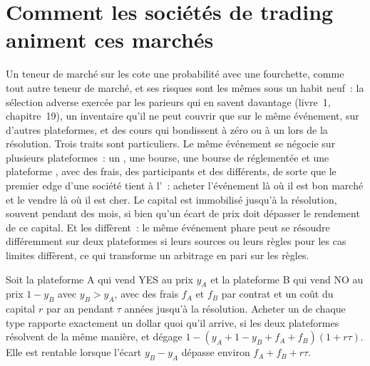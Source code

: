 \section{Comment les sociétés de trading animent ces marchés}

Un teneur de marché sur les  cote une probabilité avec une fourchette, comme tout autre teneur de marché, et ses risques sont les mêmes sous un habit neuf~: la sélection
adverse exercée par les parieurs qui en savent davantage (livre~1, chapitre~19), un inventaire qu'il ne peut couvrir que sur le même événement, sur d'autres plateformes, et des cours
qui bondissent à zéro ou à un lors de la résolution. Trois traits sont particuliers. Le même événement se négocie sur plusieurs plateformes~: un , une bourse, une
bourse de  réglementée et une plateforme , avec des frais, des participants et des  différents, de sorte que le premier edge d'une société tient à l'~:
acheter l'événement là où il est bon marché et le vendre là où il est cher. Le capital est immobilisé jusqu'à la résolution, souvent pendant des mois, si bien qu'un écart de prix doit dépasser le
rendement de ce capital. Et les  diffèrent~: le même événement phare peut se résoudre différemment sur deux plateformes si leurs sources ou leurs règles pour
les cas limites diffèrent, ce qui transforme un arbitrage en pari sur les règles.

\begin{proposition}\label{prop:m3:prediction-and-betting-markets:gap}
Soit la plateforme A qui vend YES au prix $y_A$ et la plateforme B qui vend NO au prix $1 - y_B$ avec $y_B > y_A$, avec des frais $f_A$ et $f_B$ par contrat et un coût du capital $r$ par an pendant
$\tau$ années jusqu'à la résolution. Acheter un de chaque type rapporte exactement un dollar quoi qu'il arrive, si les deux plateformes résolvent de la même manière, et dégage
$1 - (y_A + 1 - y_B + f_A + f_B)(1 + r\tau)$. Elle est rentable lorsque l'écart $y_B - y_A$ dépasse environ $f_A + f_B + r\tau$.
\end{proposition}

